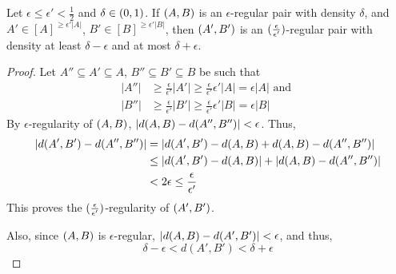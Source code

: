    \begin{lemma} \label{lem:regularity_is_transitive}
        Let $\epsilon \leq \epsilon' < \frac{1}{2}$ and $\delta \in ( 0, 1 )$.
        If $( A,B )$ is an $\epsilon$-regular pair with density $\delta$, and $A' \in [A]^{\geq \epsilon' |A|}$,
        $B' \in [B]^{\geq \epsilon' |B|}$, then $( A', B' )$ is an $( \frac{\epsilon}{\epsilon'} )$-regular
        pair with density at least $\delta - \epsilon$ and at most $\delta + \epsilon$.
        \begin{proof}
            Let $A'' \subseteq A' \subseteq A$, $B'' \subseteq B' \subseteq B$ be such that
            \begin{align*}
                |A''| & \geq \frac{\epsilon}{\epsilon'} |A'| \geq \frac{\epsilon}{\epsilon'} \epsilon' |A| = \epsilon |A|
                \text{ and } \\
                |B''| & \geq \frac{\epsilon}{\epsilon'} |B'| \geq \frac{\epsilon}{\epsilon'} \epsilon' |B| = \epsilon |B|
            \end{align*}
            By $\epsilon$-regularity of $( A,B )$, $| d(A,B) - d(A'',B'') | < \epsilon$.
            Thus,
            \begin{align*}
                | d(A',B') - d(A'',B'') |
                    & = | d(A',B') - d(A,B) + d(A,B) - d(A'',B'') | \\
                    & \leq | d(A',B') - d(A,B) | + | d(A,B) - d(A'',B'') | \\
                    & < 2 \epsilon \leq \frac{\epsilon}{\epsilon'}
            \end{align*}
            This proves the $( \frac{\epsilon}{\epsilon'} )$-regularity of $( A',B' )$.

            Also, since $( A,B )$ is $\epsilon$-regular, $| d(A,B) - d(A',B') | < \epsilon$,
            and thus,
            \[
                \delta - \epsilon < d(A',B') < \delta + \epsilon
            \]
        \end{proof}
    \end{lemma}

